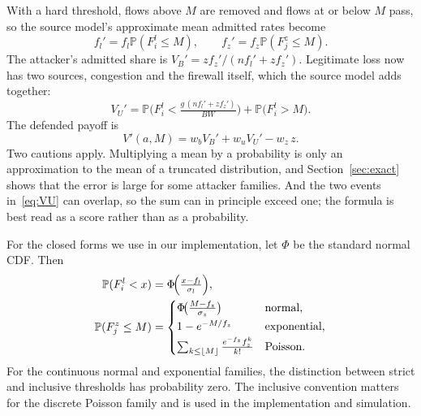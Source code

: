 \documentclass[conference]{IEEEtran}
\renewcommand{\Pr}{\mathbb{P}}
\begin{document}
With a hard threshold, flows above $M$ are removed and flows at or below $M$ pass, so the source model's approximate mean admitted rates become
\begin{equation}
f_l'=f_l\Pr(F^l_i\le M),\qquad f_z'=f_z\Pr(F^z_j\le M).
\end{equation}
The attacker's admitted share is $V_B'=z f_z'/(n f_l'+z f_z')$. Legitimate loss now has two sources, congestion and the firewall itself, which the source model adds together:
\begin{equation}
V_U'=\Pr\!\Big(F^l_i<\tfrac{g\,(n f_l'+z f_z')}{BW}\Big)+\Pr\big(F^l_i>M\big).
\label{eq:VU}
\end{equation}
The defended payoff is
\begin{equation}
V'(a,M)=w_b V_B'+w_u V_U'-w_z\,z.
\label{eq:Vp}
\end{equation}
Two cautions apply. Multiplying a mean by a probability is only an approximation to the mean of a truncated distribution, and Section~\ref{sec:exact} shows that the error is large for some attacker families. And the two events in~\eqref{eq:VU} can overlap, so the sum can in principle exceed one; the formula is best read as a score rather than as a probability.

For the closed forms we use in our implementation, let $\Phi$ be the standard normal CDF. Then
\begin{align}
\Pr(F^l_i<x)&=\Phi\!\Big(\tfrac{x-f_l}{\sigma_l}\Big),\notag\\
\Pr(F^z_j\le M)&=\begin{cases}
\Phi\!\big(\tfrac{M-f_z}{\sigma_z}\big) & \text{normal,}\\[2pt]
1-e^{-M/f_z} & \text{exponential,}\\[2pt]
\sum_{k\le\lfloor M\rfloor}\tfrac{e^{-f_z}f_z^{k}}{k!} & \text{Poisson.}
\end{cases}
\label{eq:cdfs}
\end{align}
For the continuous normal and exponential families, the distinction between strict and inclusive thresholds has probability zero. The inclusive convention matters for the discrete Poisson family and is used in the implementation and simulation.
\end{document}
